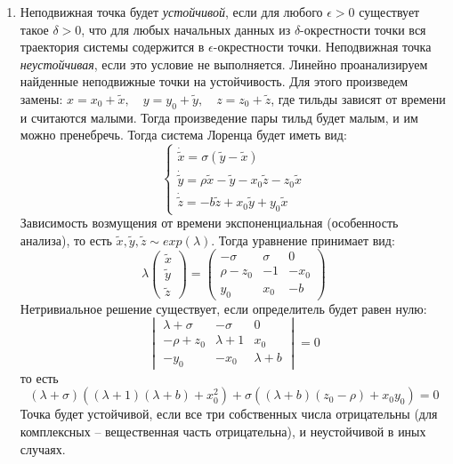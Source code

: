 \documentclass[12pt]{article}
\begin{document}
\begin{enumerate}
\item Неподвижная точка будет \textit{устойчивой}, если для любого $\epsilon > 0$ существует такое $\delta > 0$, что для любых начальных данных из $\delta$-окрестности точки вся траектория системы содержится в $\epsilon$-окрестности точки. Неподвижная точка \textit{неустойчивая}, если это условие не выполняется. Линейно проанализируем найденные неподвижные точки на устойчивость. Для этого произведем замены: $x=x_0+\tilde{x}, \quad y=y_0+\tilde{y}, \quad z=z_0+\tilde{z}$, где тильды зависят от времени и считаются малыми. Тогда произведение пары тильд будет малым, и им можно пренебречь. Тогда система Лоренца будет иметь вид:
$$\begin{cases}
\dot{\tilde{x}} = \sigma(\tilde{y}-\tilde{x}) \\
\dot{\tilde{y}} = \rho\tilde{x}-\tilde{y}-x_0\tilde{z}-z_0\tilde{x} \\
\dot{\tilde{z}} = -b\tilde{z}+x_0\tilde{y}+y_0\tilde{x}
\end{cases}$$ 
Зависимость возмущения от времени экспоненциальная (особенность анализа), то есть  $ \tilde{x}, \tilde{y}, \tilde{z} \sim exp(\lambda)$. Тогда уравнение принимает вид:
\begin{equation*}
\lambda
\begin{pmatrix}
\tilde{x} \\
\tilde{y} \\
\tilde{z}
\end{pmatrix}
=
\begin{pmatrix}
-\sigma & \sigma & 0\\
\rho-z_0 & -1 & -x_0 \\
y_0 & x_0 & -b
\end{pmatrix}
\end{equation*}
Нетривиальное решение существует, если определитель будет равен нулю:
\begin{equation*}
\begin{vmatrix}
\lambda+\sigma & -\sigma & 0\\
-\rho+z_0 & \lambda+1 & x_0 \\
-y_0 & -x_0 & \lambda+b
\end{vmatrix}
=0
\end{equation*}
то есть
\begin{equation*}
(\lambda+\sigma)((\lambda+1)(\lambda+b)+x_0^2)+\sigma((\lambda+b)(z_0-\rho)+x_0y_0)=0
\end{equation*}
Точка будет устойчивой, если все три собственных числа отрицательны (для комплексных -- вещественная часть отрицательна), и неустойчивой в иных случаях.

\end{enumerate}
\end{document}
